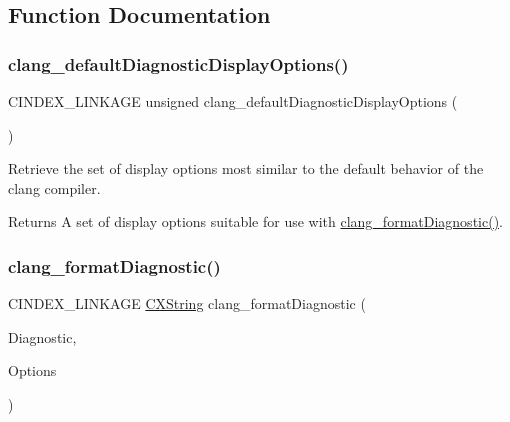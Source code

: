 \subsection{Function Documentation}
\mbox{\label{group__CINDEX__DIAG_ga5fcf910792541399efd63c62042ce353}} 
\subsubsection{\texorpdfstring{clang\+\_\+default\+Diagnostic\+Display\+Options()}{clang\_defaultDiagnosticDisplayOptions()}}
{\footnotesize\ttfamily C\+I\+N\+D\+E\+X\+\_\+\+L\+I\+N\+K\+A\+GE unsigned clang\+\_\+default\+Diagnostic\+Display\+Options (\begin{DoxyParamCaption}\item[{void}]{ }\end{DoxyParamCaption})}



Retrieve the set of display options most similar to the default behavior of the clang compiler. 

\begin{DoxyReturn}{Returns}
A set of display options suitable for use with {\ttfamily \mbox{\hyperlink{group__CINDEX__DIAG_ga455234ab6de0ca12c9ea36f8874060e8}{clang\+\_\+format\+Diagnostic()}}}. 
\end{DoxyReturn}
\mbox{\label{group__CINDEX__DIAG_ga455234ab6de0ca12c9ea36f8874060e8}} 
\subsubsection{\texorpdfstring{clang\+\_\+format\+Diagnostic()}{clang\_formatDiagnostic()}}
{\footnotesize\ttfamily C\+I\+N\+D\+E\+X\+\_\+\+L\+I\+N\+K\+A\+GE \mbox{\hyperlink{structCXString}{C\+X\+String}} clang\+\_\+format\+Diagnostic (\begin{DoxyParamCaption}\item[{\mbox{\hyperlink{group__CINDEX__DIAG_ga44bb8aba7c40590ad25d1763c4fbff7f}{C\+X\+Diagnostic}}}]{Diagnostic,  }\item[{unsigned}]{Options }\end{DoxyParamCaption})}



